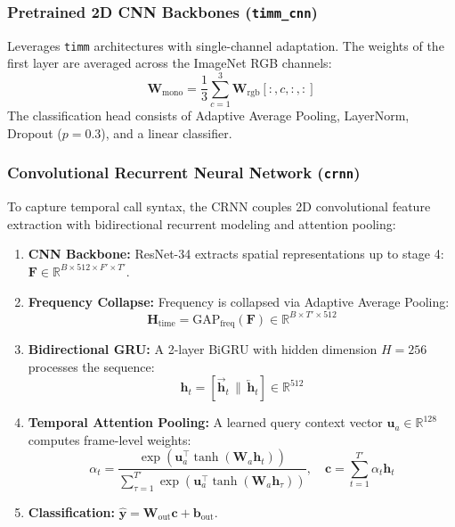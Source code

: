 \documentclass[11pt,a4paper]{article}
\begin{document}
\subsubsection{Pretrained 2D CNN Backbones (\texttt{timm\_cnn})}
Leverages \texttt{timm} architectures with single-channel adaptation. The weights of the first layer are averaged across the ImageNet RGB channels:
\begin{equation}
    \mathbf{W}_{\text{mono}} = \frac{1}{3} \sum_{c=1}^3 \mathbf{W}_{\text{rgb}}[:, c, :, :]
\end{equation}
The classification head consists of Adaptive Average Pooling, LayerNorm, Dropout ($p=0.3$), and a linear classifier.

\subsubsection{Convolutional Recurrent Neural Network (\texttt{crnn})}
To capture temporal call syntax, the CRNN couples 2D convolutional feature extraction with bidirectional recurrent modeling and attention pooling:
\begin{enumerate}[leftmargin=*]
    \item \textbf{CNN Backbone:} ResNet-34 extracts spatial representations up to stage 4: $\mathbf{F} \in \mathbb{R}^{B \times 512 \times F' \times T'}$.
    \item \textbf{Frequency Collapse:} Frequency is collapsed via Adaptive Average Pooling: 
    \begin{equation}
        \mathbf{H}_{\text{time}} = \text{GAP}_{\text{freq}}(\mathbf{F}) \in \mathbb{R}^{B \times T' \times 512}
    \end{equation}
    \item \textbf{Bidirectional GRU:} A 2-layer BiGRU with hidden dimension $H=256$ processes the sequence:
    \begin{equation}
        \mathbf{h}_t = [\overrightarrow{\mathbf{h}}_t \,\|\, \overleftarrow{\mathbf{h}}_t] \in \mathbb{R}^{512}
    \end{equation}
    \item \textbf{Temporal Attention Pooling:} A learned query context vector $\mathbf{u}_a \in \mathbb{R}^{128}$ computes frame-level weights:
    \begin{equation}
        \alpha_t = \frac{\exp(\mathbf{u}_a^\top \tanh(\mathbf{W}_a \mathbf{h}_t))}{\sum_{\tau=1}^{T'} \exp(\mathbf{u}_a^\top \tanh(\mathbf{W}_a \mathbf{h}_\tau))}, \quad \mathbf{c} = \sum_{t=1}^{T'} \alpha_t \mathbf{h}_t
    \end{equation}
    \item \textbf{Classification:} $\hat{\mathbf{y}} = \mathbf{W}_{\text{out}} \mathbf{c} + \mathbf{b}_{\text{out}}$.
\end{enumerate}
\end{document}
